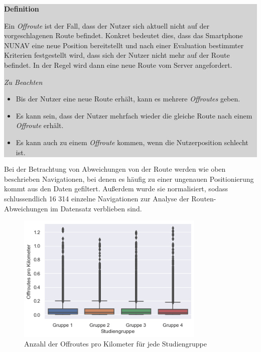 \noindent\colorbox{lightgray}{%
    \parbox{0.975\linewidth}{
        \textbf{Definition}

        Ein \textit{Offroute} ist der Fall, dass der Nutzer sich aktuell nicht auf der vorgeschlagenen Route befindet. Konkret bedeutet dies, dass das Smartphone NUNAV eine neue Position bereitstellt und nach einer Evaluation bestimmter Kriterien festgestellt wird, dass sich der Nutzer nicht mehr auf der Route befindet. In der Regel wird dann eine neue Route vom Server angefordert.
        
        \textit{Zu Beachten}
        \begin{itemize}
            \item Bis der Nutzer eine neue Route erhält, kann es mehrere \textit{Offroutes} geben.
            \item Es kann sein, dass der Nutzer mehrfach wieder die gleiche Route nach einem \textit{Offroute} erhält.
            \item Es kann auch zu einem \textit{Offroute} kommen, wenn die Nutzerposition schlecht ist.
        \end{itemize}
    }
}

\smallskip

Bei der Betrachtung von Abweichungen von der Route werden wie oben beschrieben Navigationen, bei denen es häufig zu einer ungenauen Positionierung kommt aus den Daten gefiltert. Außerdem wurde sie normalisiert, sodass schlussendlich 16 314 einzelne Navigationen zur Analyse der Routen-Abweichungen im Datensatz verblieben sind.

\begin{figure}
    \centering
    \includegraphics[width=0.8\textwidth]{contents/06_model_evaluation/res/OffRoute_Result_Overview.png}
    \caption{Anzahl der Offroutes pro Kilometer für jede Studiengruppe}
\end{figure}

